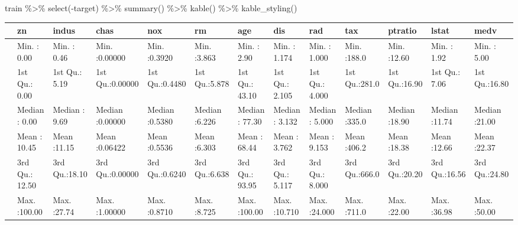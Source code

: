 \documentclass[
]{article}
\newenvironment{Shaded}{\begin{snugshade}}{\end{snugshade}}
\newcommand{\FunctionTok}[1]{\textcolor[rgb]{0.00,0.00,0.00}{#1}}
\newcommand{\NormalTok}[1]{#1}
\newcommand{\SpecialCharTok}[1]{\textcolor[rgb]{0.00,0.00,0.00}{#1}}
\begin{document}
\begin{Shaded}
\begin{Highlighting}[]
\NormalTok{train }\SpecialCharTok{\%\textgreater{}\%}
  \FunctionTok{select}\NormalTok{(}\SpecialCharTok{{-}}\NormalTok{target) }\SpecialCharTok{\%\textgreater{}\%}
  \FunctionTok{summary}\NormalTok{() }\SpecialCharTok{\%\textgreater{}\%}
  \FunctionTok{kable}\NormalTok{() }\SpecialCharTok{\%\textgreater{}\%}
  \FunctionTok{kable\_styling}\NormalTok{()}
\end{Highlighting}
\end{Shaded}

\begin{table}[H]
\centering
\begin{tabular}{l|l|l|l|l|l|l|l|l|l|l|l|l}
\hline
  &       zn &     indus &      chas &      nox &       rm &      age &      dis &      rad &      tax &    ptratio &     lstat &      medv\\
\hline
 & Min.   :  0.00 & Min.   : 0.46 & Min.   :0.00000 & Min.   :0.3920 & Min.   :3.863 & Min.   :  2.90 & Min.   : 1.174 & Min.   : 1.000 & Min.   :188.0 & Min.   :12.60 & Min.   : 1.92 & Min.   : 5.00\\
\hline
 & 1st Qu.:  0.00 & 1st Qu.: 5.19 & 1st Qu.:0.00000 & 1st Qu.:0.4480 & 1st Qu.:5.878 & 1st Qu.: 43.10 & 1st Qu.: 2.105 & 1st Qu.: 4.000 & 1st Qu.:281.0 & 1st Qu.:16.90 & 1st Qu.: 7.06 & 1st Qu.:16.80\\
\hline
 & Median :  0.00 & Median : 9.69 & Median :0.00000 & Median :0.5380 & Median :6.226 & Median : 77.30 & Median : 3.132 & Median : 5.000 & Median :335.0 & Median :18.90 & Median :11.74 & Median :21.00\\
\hline
 & Mean   : 10.45 & Mean   :11.15 & Mean   :0.06422 & Mean   :0.5536 & Mean   :6.303 & Mean   : 68.44 & Mean   : 3.762 & Mean   : 9.153 & Mean   :406.2 & Mean   :18.38 & Mean   :12.66 & Mean   :22.37\\
\hline
 & 3rd Qu.: 12.50 & 3rd Qu.:18.10 & 3rd Qu.:0.00000 & 3rd Qu.:0.6240 & 3rd Qu.:6.638 & 3rd Qu.: 93.95 & 3rd Qu.: 5.117 & 3rd Qu.: 8.000 & 3rd Qu.:666.0 & 3rd Qu.:20.20 & 3rd Qu.:16.56 & 3rd Qu.:24.80\\
\hline
 & Max.   :100.00 & Max.   :27.74 & Max.   :1.00000 & Max.   :0.8710 & Max.   :8.725 & Max.   :100.00 & Max.   :10.710 & Max.   :24.000 & Max.   :711.0 & Max.   :22.00 & Max.   :36.98 & Max.   :50.00\\
\hline
\end{tabular}
\end{table}
\end{document}
